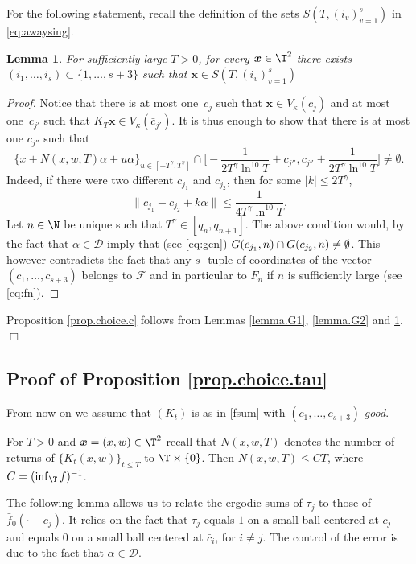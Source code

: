 \documentclass[JEP,XML,SOM,Unicode,NoFloatCountersInSection]{cedram}
\let\DS\relax
\newcommand\cD{\mathcal{D}}
\newcommand\cF{\mathcal{F}}
\newcommand\bx{\boldsymbol{x}}
\theoremstyle{definition}
\theoremstyle{plain}
\newtheorem{lemma}[definition]{Lemma}
\begin{document}
For the following statement, recall the definition of the sets $S(T,(i_v)_{v=1}^s)$ in \eqref{eq:awaysing}.
\begin{lemma}\label{lem:sep}
For sufficiently large $T>0$, for every $\bx\in \T^2$ there exists $(i_1,\ldots,i_s)\subset \{1,\ldots,s+3\}$ such that $\bx\in S(T,(i_v)_{v=1}^s)$
\end{lemma}

\begin{proof} Notice that there is at most one~$c_j$ such that $\bx\in V_\kappa(\bar{c}_j)$ and at most one~$c_{j'}$ such that ${K_T}\bx\in V_\kappa(\bar{c}_{j'})$. It is thus enough to show that there is at most one $c_{j''}$ such that
\[
\{x+N(x,w,T)\alpha+u\alpha\}_{u\in [-T^\gamma,T^\gamma]} \cap \Big[-\frac{1}{2T^\gamma\ln^{10}T}+ c_{j''}, c_{j''}+\frac{1}{2T^\gamma\ln^{10}T}\Big] \neq \emptyset.
\]
Indeed, if there were two different $c_{j_1}$ and $c_{j_2}$, then for some $|k|\leq 2T^\gamma$,
\[
\|c_{j_1}-c_{j_2}+k\alpha\|\leq \frac{1}{4T^\gamma\ln^{10}T}.
\]
Let $n\in \N$ be unique such that $T^\gamma \in [q_n,q_{n+1}]$. The above condition would, by the fact that $\alpha\in \cD$ imply that (see \eqref{eq:gcn})
$\DS
G(c_{j_1},n)\cap G(c_{j_2},n)\neq \emptyset$.
This however contradicts the fact that any $s$- tuple of coordinates of the vector $(c_1,\ldots, c_{s+3})$ belongs to $\cF$ and in particular to $F_n$ if $n$ is sufficiently large (see \eqref{eq:fn}).
\end{proof}

Proposition \ref{prop.choice.c} follows from Lemmas \ref{lemma.G1}, \ref{lemma.G2} and \ref{lem:sep}. \hfill $\Box$

\subsection{Proof of Proposition \ref{prop.choice.tau}}
\label{SSprop.choice.tau}

From now on we assume that $(K_t)$ is as in \eqref{fsum} with $(c_1,\ldots,c_{s+3})$ {\it good}.

For $T>0$ and $\bx=(x,w)\in \T^2$ recall that $N(x,w,T)$ denotes the number of returns of $\{K_t(x,w)\}_{t\leq T}$ to
$\T\times \{0\}$. Then $N(x,w,T)\leq C T$, where $C=(\inf_\T f)^{-1}$.

The following lemma allows us to relate the ergodic sums of $\tau_j$ to those of $\bar f_0(\cdot-c_j)$. It relies on the fact that $\tau_j$ equals $1$ on a small ball centered at $\bar{c}_j$ and equals $0$ on a small ball centered at $\bar{c}_i$, for $i\neq j$. The control of the error is due to the fact that $\alpha \in \cD$.
\end{document}
